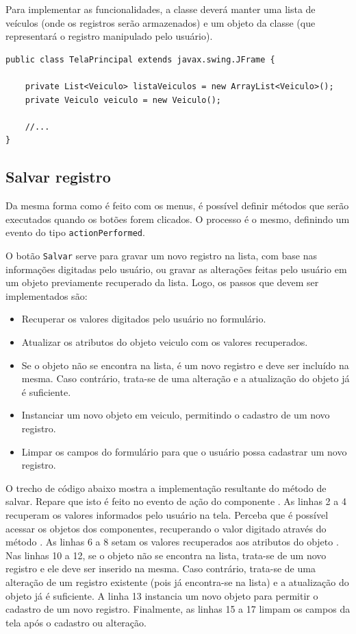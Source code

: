 Para implementar as funcionalidades, a classe  deverá manter uma lista de veículos (onde os registros serão armazenados) e um objeto da classe  (que representará o registro manipulado pelo usuário).

\begin{verbatim}
public class TelaPrincipal extends javax.swing.JFrame {

	private List<Veiculo> listaVeiculos = new ArrayList<Veiculo>();
	private Veiculo veiculo = new Veiculo();

	//...
}
\end{verbatim}

\subsection{Salvar registro}
Da mesma forma como é feito com os menus, é possível definir métodos que serão executados quando os botões forem clicados. O processo é o mesmo, definindo um evento do tipo \texttt{actionPerformed}.

O botão \texttt{Salvar} serve para gravar um novo registro na lista, com base nas informações digitadas pelo usuário, ou gravar as alterações feitas pelo usuário em um objeto previamente recuperado da lista. Logo, os passos que devem ser implementados são:

\begin{itemize}
	\item Recuperar os valores digitados pelo usuário no formulário.
	\item Atualizar os atributos do objeto veiculo com os valores recuperados.
	\item Se o objeto não se encontra na lista, é um novo registro e deve ser incluído na mesma. Caso contrário, trata-se de uma alteração e a atualização do objeto já é suficiente.
	\item Instanciar um novo objeto em veiculo, permitindo o cadastro de um novo registro.
	\item Limpar os campos do formulário para que o usuário possa cadastrar um novo registro.
\end{itemize}

O trecho de código abaixo mostra a implementação resultante do método de salvar. Repare que isto é feito no evento de ação do componente . As linhas 2 a 4 recuperam os valores informados pelo usuário na tela. Perceba que é possível acessar os objetos dos componentes, recuperando o valor digitado através do método . As linhas 6 a 8 setam os valores recuperados aos atributos do objeto . Nas linhas 10 a 12, se o objeto não se encontra na lista, trata-se de um novo registro e ele deve ser inserido na mesma. Caso contrário, trata-se de uma alteração de um registro existente (pois já encontra-se na lista) e a atualização do objeto já é suficiente. A linha 13 instancia um novo objeto para permitir o cadastro de um novo registro. Finalmente, as linhas 15 a 17 limpam os campos da tela após o cadastro ou alteração.

